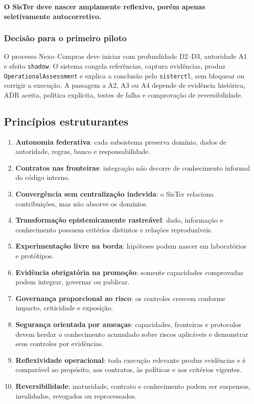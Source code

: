 \documentclass[11pt,a4paper,oneside]{article}
\begin{document}
\begin{principio}
\centering
\textbf{O SisTer deve nascer amplamente reflexivo, porém apenas seletivamente autocorretivo.}
\end{principio}

\subsubsection{Decisão para o primeiro piloto}
O processo Nexo--Compras deve iniciar com profundidade D2--D3, autoridade A1 e efeito \texttt{shadow}. O sistema congela referências, captura evidências, produz \texttt{OperationalAssessment} e explica a conclusão pelo \texttt{sisterctl}, sem bloquear ou corrigir a execução. A passagem a A2, A3 ou A4 depende de evidência histórica, ADR aceita, política explícita, testes de falha e comprovação de reversibilidade.

\subsection{Princípios estruturantes}
\begin{enumerate}
  \item \textbf{Autonomia federativa}: cada subsistema preserva domínio, dados de autoridade, regras, banco e responsabilidade.
  \item \textbf{Contratos nas fronteiras}: integração não decorre de conhecimento informal do código interno.
  \item \textbf{Convergência sem centralização indevida}: o SisTer relaciona contribuições, mas não absorve os domínios.
  \item \textbf{Transformação epistemicamente rastreável}: dado, informação e conhecimento possuem critérios distintos e relações reproduzíveis.
  \item \textbf{Experimentação livre na borda}: hipóteses podem nascer em laboratórios e protótipos.
  \item \textbf{Evidência obrigatória na promoção}: somente capacidades comprovadas podem integrar, governar ou publicar.
  \item \textbf{Governança proporcional ao risco}: os controles crescem conforme impacto, criticidade e exposição.
  \item \textbf{Segurança orientada por ameaças}: capacidades, fronteiras e protocolos devem herdar o conhecimento acumulado sobre riscos aplicáveis e demonstrar seus controles por evidências.
  \item \textbf{Reflexividade operacional}: toda execução relevante produz evidências e é comparável ao propósito, aos contratos, às políticas e aos critérios vigentes.
  \item \textbf{Reversibilidade}: maturidade, contrato e conhecimento podem ser suspensos, invalidados, revogados ou reprocessados.
\end{enumerate}
\end{document}
